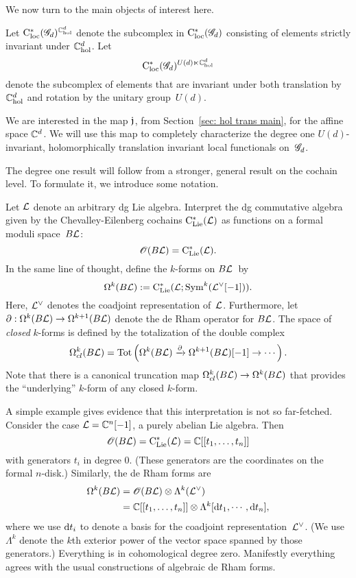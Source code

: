 We now turn to the main objects of interest here.

\begin{dfn}
Let ${\rm C}_{\rm loc}^*(\mathscr G_d)^{\mathbb C^d_{\rm hol}}$ denote the subcomplex in ${\rm C}_{\rm loc}^*(\mathscr G_d)$ consisting of elements strictly invariant under $\mathbb C^d_{\rm hol}$.
Let
\[
{\rm C}_{\rm loc}^*(\mathscr G_d)^{U(d) \ltimes \mathbb C^d_{\rm hol}}
\]
denote the subcomplex of elements that are invariant under both translation by $\mathbb C^d_{\rm hol}$ and rotation by the unitary group~$U(d)$.
\end{dfn}

We are interested in the map $\mathfrak j$, from Section~\ref{sec: hol trans main}, for the affine space $\mathbb C^d$.
We will use this map to completely characterize the degree one $U(d)$-invariant, holomorphically translation invariant local functionals on~$\mathscr G_d$. 

The degree one result will follow from a stronger, general result on the cochain level.
To formulate it, we introduce some notation.

Let $\mathcal L$ denote an arbitrary dg Lie algebra. 
Interpret the dg commutative algebra given by the Chevalley-Eilenberg cochains ${\rm C}_{{\rm Lie}}^*(\mathcal L)$ as functions on a formal moduli space~$B \mathcal L$:
\[
\mathscr O(B \mathcal L) = {\rm C}_{{\rm Lie}}^*(\mathcal L) .
\]
In the same line of thought, define the $k$-forms on $B\mathcal L$~by
\[
\Omega^k(B \mathcal L) := {\rm C}_{{\rm Lie}}^*(\mathcal L ; {\rm Sym}^k(\mathcal L^\vee [-1])) .
\]
Here, $\mathcal L^\vee$ denotes the coadjoint representation of~$\mathcal L$. 
Furthermore, let $\partial : \Omega^{k}(B\mathcal L) \to \Omega^{k+1}(B\mathcal L)$ denote the de Rham operator for $B\mathcal L$. 
The space of {\em closed} $k$-forms is defined by the totalization of the double complex
\[
\Omega^{k}_{cl}(B \mathcal L) = {\rm Tot}\left( \Omega^k(B\mathcal L) \xrightarrow{\partial} \Omega^{k+1}(B \mathcal L)[-1] \to \cdots \right).
\]
Note that there is a canonical truncation map $\Omega^{k}_{cl}(B \mathcal L) \to \Omega^{k}(B \mathcal L)$ that provides the ``underlying'' $k$-form of any closed $k$-form.

\begin{eg}
A simple example gives evidence that this interpretation is not so far-fetched.
Consider the case $\mathcal L = \mathbb C^n [-1]$, a purely abelian Lie algebra.
Then
\[
\mathscr O(B \mathcal L) = {\rm C}_{{\rm Lie}}^*(\mathcal L) = \mathbb C[[t_1,\ldots,t_n]]
\]
with generators $t_i$ in degree 0.
(These generators are the coordinates on the formal $n$-disk.)
Similarly, the de Rham forms are
\begin{align*}
\Omega^k(B \mathcal L) 
&= \mathscr O(B \mathcal L)  \otimes \Lambda^k(\mathcal L^\vee) \\
 &=\mathbb C[[t_1,\ldots, t_n]] \otimes \Lambda^k[{\rm d} t_1, \cdots, {\rm d} t_n],
\end{align*}
where we use ${\rm d} t_i$ to denote a basis for the coadjoint representation~$\mathcal L^\vee$.
(We use $\Lambda^k$ denote the $k$th exterior power of the vector space spanned by those generators.)
Everything is in cohomological degree zero.
Manifestly everything agrees with the usual constructions of algebraic de Rham forms.
\end{eg}

